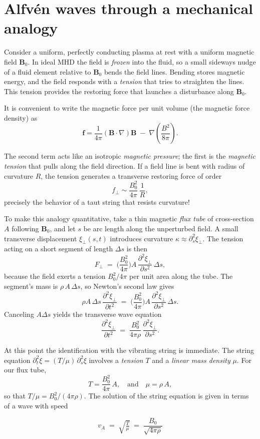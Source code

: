 \section{Alfv\'en waves through a mechanical analogy}

Consider a uniform, perfectly conducting plasma at rest with a uniform magnetic field
\(\mathbf B_0\).
In ideal MHD the field is \emph{frozen} into the fluid, so a small sideways nudge of a fluid element relative to \(\mathbf B_0\) bends the field lines. Bending stores magnetic energy, and the field responds with a \emph{tension} that tries to straighten the lines. This tension provides the restoring force that launches a disturbance along \(\mathbf B_0\).

It is convenient to write the magnetic force per unit volume (the magnetic force density) as
\[
\mathbf f
= \frac{1}{4\pi}(\mathbf B\!\cdot\!\nabla)\mathbf B
\;-\;\nabla\!\left(\frac{B^2}{8\pi}\right).
\]

The second term acts like an isotropic \emph{magnetic pressure}; the first is the \emph{magnetic tension} that pulls along the field direction. If a field line is bent with radius of curvature \(R\), the tension generates a transverse restoring force of order
\[
f_\perp \sim \frac{B_0^2}{4\pi}\,\frac{1}{R},
\]
precisely the behavior of a taut string that resists curvature!

To make this analogy quantitative, take a thin magnetic \emph{flux tube} of cross-section \(A\) following \(\mathbf B_0\), and let \(s\) be arc length along the unperturbed field. A small transverse displacement \(\xi_\perp(s,t)\) introduces curvature \(\kappa \approx \partial_s^2 \xi_\perp\).
The tension acting on a short segment of length \(\Delta s\) is then
\[
F_\perp \;=\; \Big(\frac{B_0^2}{4\pi}\Big) A\,\frac{\partial^2 \xi_\perp}{\partial s^2}\,\Delta s,
\]
because the field exerts a tension \(B_0^2/4\pi\) per unit area along the tube.
The segment’s mass is \(\rho\,A\,\Delta s\), so Newton’s second law gives
\[
\rho A\,\Delta s\,\frac{\partial^2\xi_\perp}{\partial t^2}
\;=\;
\Big(\frac{B_0^2}{4\pi}\Big) A\,\frac{\partial^2 \xi_\perp}{\partial s^2}\,\Delta s.
\]
Canceling \(A\Delta s\) yields the transverse wave equation
\[
\frac{\partial^2\xi_\perp}{\partial t^2}
\;=\;
\frac{B_0^2}{4\pi\rho}\,\frac{\partial^2\xi_\perp}{\partial s^2}.
\]

At this point the identification with the vibrating string is immediate. The string equation
\(\partial_t^2 \xi = (T/\mu)\,\partial_s^2 \xi\)
involves a \emph{tension} \(T\) and a \emph{linear mass density} \(\mu\).
For our flux tube,
\[
T=\frac{B_0^2}{4\pi}\,A,
\quad \text{and} \quad
\mu=\rho\,A,
\]
so that \(T/\mu = B_0^2/(4\pi\rho)\).
The solution of the string equation is given in terms of a wave with speed
\begin{remark}
\[
v_A \;=\; \sqrt{\tfrac{T}{\mu}} \;=\; \frac{B_0}{\sqrt{4\pi\rho}}
\]
\end{remark}

